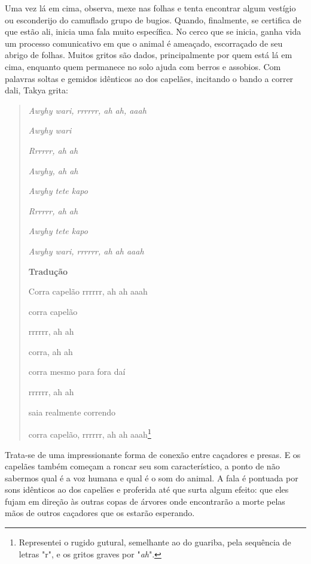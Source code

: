 Uma vez lá em cima, observa, mexe nas folhas e tenta encontrar algum
vestígio ou esconderijo do camuflado grupo de bugios. Quando,
finalmente, se certifica de que estão ali, inicia uma fala muito
específica. No cerco que se inicia, ganha vida um processo comunicativo
em que o animal é ameaçado, escorraçado de seu abrigo de folhas. Muitos
gritos são dados, principalmente por quem está lá em cima, enquanto quem
permanece no solo ajuda com berros e assobios. Com palavras soltas e
gemidos idênticos ao dos capelães, incitando o bando a correr dali,
Takya grita:

\begin{quote}
\emph{Awyhy wari, rrrrrr, ah ah, aaah}

\emph{Awyhy wari}

\emph{Rrrrrr, ah ah}

\emph{Awyhy, ah ah}

\emph{Awyhy tete kapo}

\emph{Rrrrrr, ah ah }

\emph{Awyhy tete kapo}

\emph{Awyhy wari, rrrrrr, ah ah aaah }

\textbf{Tradução }

Corra capelão rrrrrr, ah ah aaah

corra capelão

rrrrrr, ah ah

corra, ah ah

corra mesmo para fora daí

rrrrrr, ah ah

saia realmente correndo

corra capelão, rrrrrr, ah ah aaah\footnote{Representei o rugido gutural,
  semelhante ao do guariba, pela sequência de letras "r", e os gritos
  graves por "\emph{ah}".}
\end{quote}

Trata-se de uma impressionante forma de conexão entre caçadores e
presas. E os capelães também começam a roncar seu som característico, a
ponto de não sabermos qual é a voz humana e qual é o som do animal. A
fala é pontuada por sons idênticos ao dos capelães e proferida até que
surta algum efeito: que eles fujam em direção às outras copas de árvores
onde encontrarão a morte pelas mãos de outros caçadores que os estarão
esperando.

